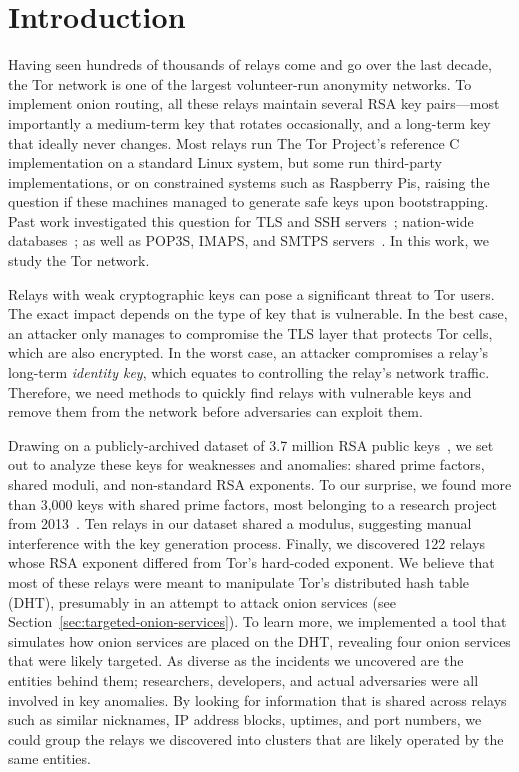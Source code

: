 \section{Introduction}
Having seen hundreds of thousands of relays come and go over the last decade,
the Tor network is one of the largest volunteer-run anonymity networks.  To
implement onion routing, all these relays maintain several RSA key pairs---most
importantly a medium-term key that rotates occasionally, and a long-term key
that ideally never changes.  Most relays run The Tor Project's reference
C implementation on a standard Linux system, but some run third-party
implementations, or on constrained systems such as Raspberry Pis, raising the
question if these machines managed to generate safe keys upon bootstrapping.
Past work investigated this question for TLS and SSH
servers~\cite{Heninger2012a}; nation-wide databases~\cite{Bernstein2013a}; as
well as POP3S, IMAPS, and SMTPS servers~\cite{Hastings2016a}.  In this work, we
study the Tor network.

Relays with weak cryptographic keys can pose a significant threat to Tor users.
The exact impact depends on the type of key that is vulnerable.  In the best
case, an attacker only manages to compromise the TLS layer that protects Tor
cells, which are also encrypted.  In the worst case, an attacker compromises a
relay's long-term \emph{identity key}, which equates to controlling the relay's
network traffic.  Therefore, we need methods to quickly find relays with
vulnerable keys and remove them from the network before adversaries can exploit
them.

Drawing on a publicly-archived dataset of 3.7 million RSA public
keys~\cite{collector}, we set out to analyze these keys for weaknesses and
anomalies: shared prime factors, shared moduli, and non-standard RSA exponents.
To our surprise, we found more than 3,000 keys with shared prime factors, most
belonging to a research project from 2013~\cite{Biryukov2013a}.  Ten relays in
our dataset shared a modulus, suggesting manual interference with the key
generation process.  Finally, we discovered 122 relays whose RSA exponent
differed from Tor's hard-coded exponent.  We believe that most of these relays
were meant to manipulate Tor's distributed hash table (DHT), presumably in an
attempt to attack onion services (see
Section~\ref{sec:targeted-onion-services}).  To learn more, we implemented a
tool that simulates how onion services are placed on the DHT, revealing four
onion services that were likely targeted.  As diverse as the incidents we
uncovered are the entities behind them; researchers, developers, and actual
adversaries were all involved in key anomalies.  By looking for information that
is shared across relays such as similar nicknames, IP address blocks, uptimes,
and port numbers, we could group the relays we discovered into clusters that are
likely operated by the same entities.

